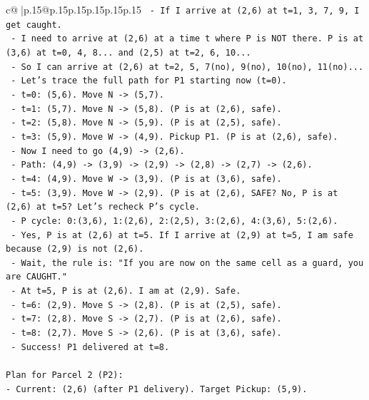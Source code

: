 \documentclass{article}
\begin{document}
{\begin{supertabular}{c@{$\;$}|p{.15\linewidth}@{}p{.15\linewidth}p{.15\linewidth}p{.15\linewidth}p{.15\linewidth}p{.15\linewidth}}
{{{\texttt{  {-} If I arrive at (2,6) at t=1, 3, 7, 9, I get caught.} \\
\texttt{  {-} I need to arrive at (2,6) at a time t where P is NOT there. P is at (3,6) at t=0, 4, 8... and (2,5) at t=2, 6, 10...} \\
\texttt{  {-} So I can arrive at (2,6) at t=2, 5, 7(no), 9(no), 10(no), 11(no)...} \\
\texttt{  {-} Let's trace the full path for P1 starting now (t=0).} \\
\texttt{  {-} t=0: (5,6). Move N {-}> (5,7).} \\
\texttt{  {-} t=1: (5,7). Move N {-}> (5,8). (P is at (2,6), safe).} \\
\texttt{  {-} t=2: (5,8). Move N {-}> (5,9). (P is at (2,5), safe).} \\
\texttt{  {-} t=3: (5,9). Move W {-}> (4,9). Pickup P1. (P is at (2,6), safe).} \\
\texttt{  {-} Now I need to go (4,9) {-}> (2,6).} \\
\texttt{  {-} Path: (4,9) {-}> (3,9) {-}> (2,9) {-}> (2,8) {-}> (2,7) {-}> (2,6).} \\
\texttt{  {-} t=4: (4,9). Move W {-}> (3,9). (P is at (3,6), safe).} \\
\texttt{  {-} t=5: (3,9). Move W {-}> (2,9). (P is at (2,6), SAFE? No, P is at (2,6) at t=5? Let's recheck P's cycle.} \\
\texttt{    {-} P cycle: 0:(3,6), 1:(2,6), 2:(2,5), 3:(2,6), 4:(3,6), 5:(2,6).} \\
\texttt{    {-} Yes, P is at (2,6) at t=5. If I arrive at (2,9) at t=5, I am safe because (2,9) is not (2,6).} \\
\texttt{    {-} Wait, the rule is: "If you are now on the same cell as a guard, you are CAUGHT."} \\
\texttt{    {-} At t=5, P is at (2,6). I am at (2,9). Safe.} \\
\texttt{  {-} t=6: (2,9). Move S {-}> (2,8). (P is at (2,5), safe).} \\
\texttt{  {-} t=7: (2,8). Move S {-}> (2,7). (P is at (2,6), safe).} \\
\texttt{  {-} t=8: (2,7). Move S {-}> (2,6). (P is at (3,6), safe).} \\
\texttt{  {-} Success! P1 delivered at t=8.} \\
\\ 
\texttt{Plan for Parcel 2 (P2):} \\
\texttt{{-} Current: (2,6) (after P1 delivery). Target Pickup: (5,9).} \\
}}}
\end{supertabular}}
\end{document}
